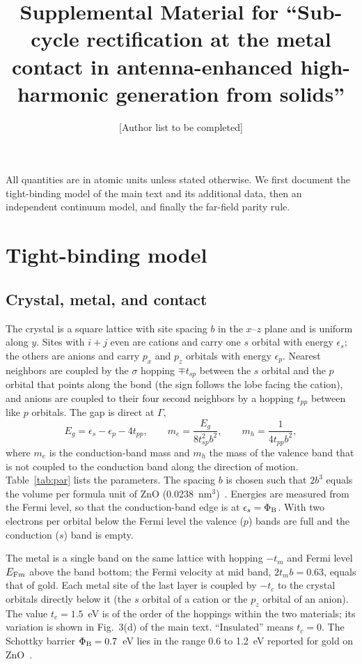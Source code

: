 \documentclass[aps,prl,onecolumn,superscriptaddress,notitlepage]{revtex4-2}
\begin{document}
\title{Supplemental Material for ``Sub-cycle rectification at the metal contact in antenna-enhanced
high-harmonic generation from solids''}
\author{[Author list to be completed]}
\maketitle

All quantities are in atomic units unless stated otherwise. We first document the tight-binding model of the main text and its additional data, then an
independent continuum model, and finally the far-field parity rule.

\section{Tight-binding model}
\label{sec:model}
\subsection{Crystal, metal, and contact}
The crystal is a square lattice with site spacing $b$ in the $x$--$z$ plane and is uniform along
$y$. Sites with $i+j$ even are cations and carry one $s$ orbital with energy $\epsilon_s$; the others
are anions and carry $p_x$ and $p_z$ orbitals with energy $\epsilon_p$. Nearest neighbors are coupled
by the $\sigma$ hopping $\mp t_{sp}$ between the $s$ orbital and the $p$ orbital that points along the
bond (the sign follows the lobe facing the cation), and anions are coupled to their four
second neighbors by a hopping $t_{pp}$ between like $p$ orbitals. The gap is direct at $\Gamma$,
\begin{equation}
E_g=\epsilon_s-\epsilon_p-4t_{pp},\qquad m_e=\frac{E_g}{8t_{sp}^2b^2},\qquad m_h=\frac{1}{4t_{pp}b^2},
\end{equation}
where $m_e$ is the conduction-band mass and $m_h$ the mass of the valence band that is not coupled
to the conduction band along the direction of motion. Table~\ref{tab:par} lists the parameters. The
spacing $b$ is chosen such that $2b^3$ equals the volume per formula unit of ZnO
(0.0238~nm$^3$)~\cite{ozgur2005}. Energies are measured from the Fermi level, so that the
conduction-band edge is at $\epsilon_s=\Phi_{\rm B}$. With two electrons per orbital below the Fermi
level the valence ($p$) bands are full and the conduction ($s$) band is empty.

The metal is a single band on the same lattice with hopping $-t_m$ and Fermi level $E_{{\rm F}m}$
above the band bottom; the Fermi velocity at mid band, $2t_mb=0.63$, equals that of gold. Each metal
site of the last layer is coupled by $-t_c$ to the crystal orbitals directly below it (the $s$ orbital
of a cation or the $p_z$ orbital of an anion). The value $t_c=1.5$~eV is of the order of the hoppings
within the two materials; its variation is shown in Fig.~3(d) of the main text. ``Insulated'' means
$t_c=0$. The Schottky barrier $\Phi_{\rm B}=0.7$~eV lies in the range 0.6 to 1.2~eV reported for gold
on ZnO~\cite{brillson2011}.
\end{document}
